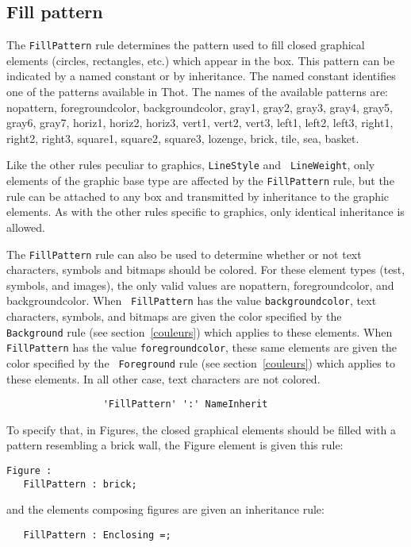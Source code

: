 \subsection{Fill pattern}
\label{remplissage}

The {\tt FillPattern} rule determines the pattern used to fill closed
graphical elements (circles, rectangles, etc.) which appear in the
box.  This pattern can be indicated by a named constant or by
inheritance.  The named constant identifies one of the patterns
available in Thot.  The names of the available patterns are:
nopattern, foregroundcolor, backgroundcolor, gray1, gray2, gray3,
gray4, gray5, gray6, gray7, horiz1, horiz2, horiz3, vert1, vert2,
vert3, left1, left2, left3, right1, right2, right3, square1, square2,
square3, lozenge, brick, tile, sea, basket.

Like the other rules peculiar to graphics, {\tt LineStyle} and {\tt
LineWeight}, only elements of the graphic base type are affected by
the {\tt FillPattern} rule, but the rule can be attached to any box
and transmitted by inheritance to the graphic elements.  As with the
other rules specific to graphics, only identical inheritance is
allowed.

The {\tt FillPattern} rule can also be used to determine whether or
not text characters, symbols and bitmaps should be colored.  For these
element types (test, symbols, and images), the only valid values are
nopattern, foregroundcolor, and backgroundcolor.  When {\tt
FillPattern} has the value {\tt backgroundcolor}, text characters,
symbols, and bitmaps are given the color specified by the {\tt
Background} rule (see section~\ref{couleurs}) which applies to these
elements.  When {\tt FillPattern} has the value {\tt foregroundcolor},
these same elements are given the color specified by the {\tt
Foreground} rule (see section~\ref{couleurs}) which applies to these
elements.  In all other case, text characters are not colored.

\begin{verbatim}
                 'FillPattern' ':' NameInherit
\end{verbatim}

\begin{example}
To specify that, in Figures, the closed graphical elements should be
filled with a pattern resembling a brick wall, the Figure element is
given this rule:

\begin{verbatim}
Figure :
   FillPattern : brick;
\end{verbatim}
and the elements composing figures are given an inheritance rule:
\begin{verbatim}
   FillPattern : Enclosing =;
\end{verbatim}
\end{example}

